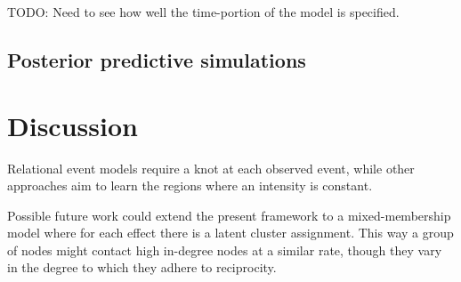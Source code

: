\documentclass[11pt]{article}
\begin{document}
TODO: Need to see how well the time-portion of the model is specified.

\subsection*{Posterior predictive simulations}

\section{Discussion}
Relational event models \cite{Butts2008} require a knot at each observed event, while other approaches \cite{Meek2011} aim to learn the regions where an intensity is constant.

Possible future work could extend the present framework to a mixed-membership model where for each effect there is a latent cluster assignment.  This way a group of nodes might contact high in-degree nodes at a similar rate, though they vary in the degree to which they adhere to reciprocity.



\end{document}

